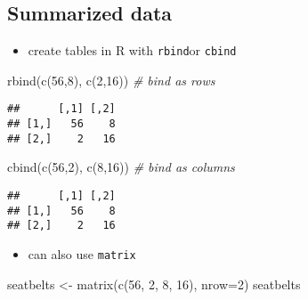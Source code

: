 \documentclass[
]{book}
\newenvironment{Shaded}{\begin{snugshade}}{\end{snugshade}}
\newcommand{\AttributeTok}[1]{\textcolor[rgb]{0.77,0.63,0.00}{#1}}
\newcommand{\CommentTok}[1]{\textcolor[rgb]{0.56,0.35,0.01}{\textit{#1}}}
\newcommand{\DecValTok}[1]{\textcolor[rgb]{0.00,0.00,0.81}{#1}}
\newcommand{\FunctionTok}[1]{\textcolor[rgb]{0.00,0.00,0.00}{#1}}
\newcommand{\NormalTok}[1]{#1}
\newcommand{\OtherTok}[1]{\textcolor[rgb]{0.56,0.35,0.01}{#1}}
\providecommand{\tightlist}{%
  \setlength{\itemsep}{0pt}\setlength{\parskip}{0pt}}
\theoremstyle{definition}
\theoremstyle{definition}
\theoremstyle{definition}
\theoremstyle{definition}
\theoremstyle{remark}
\begin{document}
\hypertarget{summarized-data}{%
\subsection{Summarized data}\label{summarized-data}}

\begin{itemize}
\tightlist
\item
  create tables in R with \texttt{rbind}or \texttt{cbind}
\end{itemize}

\begin{Shaded}
\begin{Highlighting}[]
\FunctionTok{rbind}\NormalTok{(}\FunctionTok{c}\NormalTok{(}\DecValTok{56}\NormalTok{,}\DecValTok{8}\NormalTok{), }\FunctionTok{c}\NormalTok{(}\DecValTok{2}\NormalTok{,}\DecValTok{16}\NormalTok{)) }\CommentTok{\# bind as rows}
\end{Highlighting}
\end{Shaded}

\begin{verbatim}
##      [,1] [,2]
## [1,]   56    8
## [2,]    2   16
\end{verbatim}

\begin{Shaded}
\begin{Highlighting}[]
\FunctionTok{cbind}\NormalTok{(}\FunctionTok{c}\NormalTok{(}\DecValTok{56}\NormalTok{,}\DecValTok{2}\NormalTok{), }\FunctionTok{c}\NormalTok{(}\DecValTok{8}\NormalTok{,}\DecValTok{16}\NormalTok{)) }\CommentTok{\# bind as columns}
\end{Highlighting}
\end{Shaded}

\begin{verbatim}
##      [,1] [,2]
## [1,]   56    8
## [2,]    2   16
\end{verbatim}

\begin{itemize}
\tightlist
\item
  can also use \texttt{matrix}
\end{itemize}

\begin{Shaded}
\begin{Highlighting}[]
\NormalTok{seatbelts }\OtherTok{\textless{}{-}} \FunctionTok{matrix}\NormalTok{(}\FunctionTok{c}\NormalTok{(}\DecValTok{56}\NormalTok{, }\DecValTok{2}\NormalTok{, }\DecValTok{8}\NormalTok{, }\DecValTok{16}\NormalTok{), }\AttributeTok{nrow=}\DecValTok{2}\NormalTok{)}
\NormalTok{seatbelts}
\end{Highlighting}
\end{Shaded}
\end{document}
